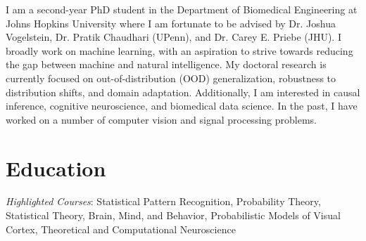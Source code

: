 \documentclass[10pt,a4paper,sans]{moderncv} %
\begin{document}
\makecvtitle %
I am a second-year PhD student in the Department of Biomedical Engineering at Johns Hopkins University where I am fortunate to be advised by Dr. Joshua Vogelstein, Dr. Pratik Chaudhari (UPenn), and Dr. Carey E. Priebe (JHU). I broadly work on machine learning, with an aspiration to strive towards reducing the gap between machine and natural intelligence. My doctoral research is currently focused on out-of-distribution (OOD) generalization, robustness to distribution shifts, and domain adaptation. Additionally, I am interested in causal inference, cognitive neuroscience, and biomedical data science. In the past, I have worked on a number of computer vision and signal processing problems.


\section{Education}
{\textit{Highlighted Courses}: Statistical Pattern Recognition, Probability Theory, Statistical Theory, Brain, Mind, and Behavior, Probabilistic Models of Visual Cortex, Theoretical and Computational Neuroscience}


\let\thefootnote\relax{}

\end{document}
